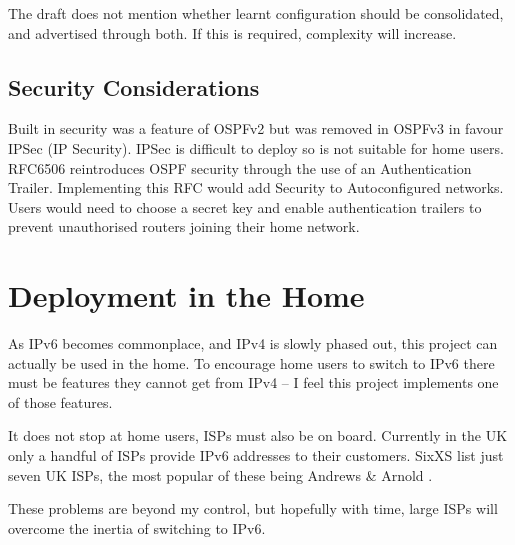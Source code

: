 The draft does not mention whether learnt configuration should be consolidated,
and advertised through both. If this is required, complexity will increase. 

\subsection{Security Considerations} 
Built in security was a feature of OSPFv2 but was removed in OSPFv3 in favour
IPSec (IP Security). IPSec is difficult to deploy so is not suitable for home
users. RFC6506 reintroduces OSPF security through the use of an Authentication
Trailer\cite{rfc6506}. Implementing this RFC would add Security to
Autoconfigured networks. Users would need to choose a secret key and enable
authentication trailers to prevent unauthorised routers joining their home
network.  

\section{Deployment in the Home}
As IPv6 becomes commonplace, and IPv4 is slowly phased out, this project can 
actually be used in the home. To encourage home users to switch to IPv6 there must 
be features they cannot get from IPv4 -- I feel this project 
implements one of those features.

It does not stop at home users, ISPs must also be on board. Currently in the UK
only a handful of ISPs provide IPv6 addresses to their customers. SixXS list
just seven UK ISPs, the most popular of these being Andrews \& Arnold
\cite{SixXS}.

These problems are beyond my control, but hopefully with time, large ISPs will
overcome the inertia of switching to IPv6.

\raggedbottom
\pagebreak
